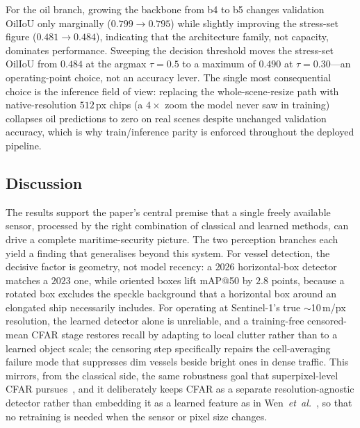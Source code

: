 \documentclass{ieeeaccess}
\begin{document}
For the oil branch, growing the backbone from b4 to b5 changes validation OilIoU only marginally ($0.799\!\rightarrow\!0.795$) while slightly improving the stress-set figure ($0.481\!\rightarrow\!0.484$), indicating that the architecture family, not capacity, dominates performance. Sweeping the decision threshold moves the stress-set OilIoU from $0.484$ at the argmax $\tau=0.5$ to a maximum of $0.490$ at $\tau=0.30$---an operating-point choice, not an accuracy lever. The single most consequential choice is the inference field of view: replacing the whole-scene-resize path with native-resolution $512$\,px chips (a $4\times$ zoom the model never saw in training) collapses oil predictions to zero on real scenes despite unchanged validation accuracy, which is why train/inference parity is enforced throughout the deployed pipeline.

\subsection{Discussion}
\label{sec:discussion}

The results support the paper's central premise that a single freely available sensor, processed by the right combination of classical and learned methods, can drive a complete maritime-security picture. The two perception branches each yield a finding that generalises beyond this system. For vessel detection, the decisive factor is geometry, not model recency: a $2026$ horizontal-box detector matches a $2023$ one, while oriented boxes lift mAP@50 by $2.8$ points, because a rotated box excludes the speckle background that a horizontal box around an elongated ship necessarily includes. For operating at Sentinel-1's true $\sim$10\,m/px resolution, the learned detector alone is unreliable, and a training-free censored-mean CFAR stage restores recall by adapting to local clutter rather than to a learned object scale; the censoring step specifically repairs the cell-averaging failure mode that suppresses dim vessels beside bright ones in dense traffic. This mirrors, from the classical side, the same robustness goal that superpixel-level CFAR pursues~\cite{11}, and it deliberately keeps CFAR as a separate resolution-agnostic detector rather than embedding it as a learned feature as in Wen~\textit{et~al.}~\cite{10}, so that no retraining is needed when the sensor or pixel size changes.
\end{document}
